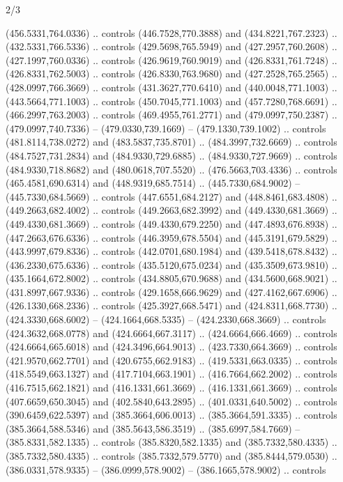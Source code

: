 \begin{flagdescription}{2/3}
\begin{scope}[xshift=0.5\flaglength,yshift=0.5\flagwidth,scale=\flagwidth/525.28]
\begin{scope}[y=0.1mm, x=0.1mm, yscale=-1,shift={(-381.5,-404)}]
\begin{scope}[shift={(5.25001,4.53053)},miter limit=4.00,line width=0.800\lw]
  (456.5331,764.0336) .. controls (446.7528,770.3888) and (434.8221,767.2323) ..
  (432.5331,766.5336) .. controls (429.5698,765.5949) and (427.2957,760.2608) ..
  (427.1997,760.0336) .. controls (426.9619,760.9019) and (426.8331,761.7248) ..
  (426.8331,762.5003) .. controls (426.8330,763.9680) and (427.2528,765.2565) ..
  (428.0997,766.3669) .. controls (431.3627,770.6410) and (440.0048,771.1003) ..
  (443.5664,771.1003) .. controls (450.7045,771.1003) and (457.7280,768.6691) ..
  (466.2997,763.2003) .. controls (469.4955,761.2771) and (479.0997,750.2387) ..
  (479.0997,740.7336) -- (479.0330,739.1669) -- (479.1330,739.1002) .. controls
  (481.8114,738.0272) and (483.5837,735.8701) .. (484.3997,732.6669) .. controls
  (484.7527,731.2834) and (484.9330,729.6885) .. (484.9330,727.9669) .. controls
  (484.9330,718.8682) and (480.0618,707.5520) .. (476.5663,703.4336) .. controls
  (465.4581,690.6314) and (448.9319,685.7514) .. (445.7330,684.9002) --
  (445.7330,684.5669) .. controls (447.6551,684.2127) and (448.8461,683.4808) ..
  (449.2663,682.4002) .. controls (449.2663,682.3992) and (449.4330,681.3669) ..
  (449.4330,681.3669) .. controls (449.4330,679.2250) and (447.4893,676.8938) ..
  (447.2663,676.6336) .. controls (446.3959,678.5504) and (445.3191,679.5829) ..
  (443.9997,679.8336) .. controls (442.0701,680.1984) and (439.5418,678.8432) ..
  (436.2330,675.6336) .. controls (435.5120,675.0234) and (435.3509,673.9810) ..
  (435.1664,672.8002) .. controls (434.8805,670.9688) and (434.5600,668.9021) ..
  (431.8997,667.9336) .. controls (429.1658,666.9629) and (427.4162,667.6906) ..
  (426.1330,668.2336) .. controls (425.3927,668.5471) and (424.8311,668.7730) ..
  (424.3330,668.6002) -- (424.1664,668.5335) -- (424.2330,668.3669) .. controls
  (424.3632,668.0778) and (424.6664,667.3117) .. (424.6664,666.4669) .. controls
  (424.6664,665.6018) and (424.3496,664.9013) .. (423.7330,664.3669) .. controls
  (421.9570,662.7701) and (420.6755,662.9183) .. (419.5331,663.0335) .. controls
  (418.5549,663.1327) and (417.7104,663.1901) .. (416.7664,662.2002) .. controls
  (416.7515,662.1821) and (416.1331,661.3669) .. (416.1331,661.3669) .. controls
  (407.6659,650.3045) and (402.5840,643.2895) .. (401.0331,640.5002) .. controls
  (390.6459,622.5397) and (385.3664,606.0013) .. (385.3664,591.3335) .. controls
  (385.3664,588.5346) and (385.5643,586.3519) .. (385.6997,584.7669) --
  (385.8331,582.1335) .. controls (385.8320,582.1335) and (385.7332,580.4335) ..
  (385.7332,580.4335) .. controls (385.7332,579.5770) and (385.8444,579.0530) ..
  (386.0331,578.9335) -- (386.0999,578.9002) -- (386.1665,578.9002) .. controls

\end{scope}
\end{scope}
\end{scope}
\end{flagdescription}
